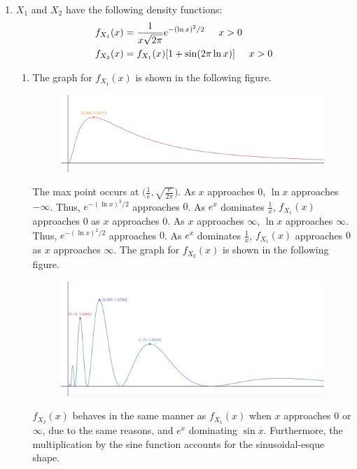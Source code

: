 \documentclass[a4paper]{article}
\newcommand{\ds}{\displaystyle}
\begin{document}
\begin{enumerate}

	\item $\ds{X_{1}}$ and $\ds{X_{2}}$ have the following density functions:
	\begin{align*}
		f_{X_1}(x) & = \frac{1}{x\sqrt{2\pi}}e^{-(\ln{x})^2/2} \hspace{5mm} x > 0 \\
		f_{X_2}(x) & = f_{X_1}(x)[1 + \sin(2\pi \ln{x})] \hspace{5mm} x > 0 \\
	\end{align*}
	\begin{enumerate}

		\item The graph for $\ds{f_{X_1}(x)}$ is shown in the following figure.
		\begin{figure}[h!]
			\begin{center}
				\includegraphics[width=0.6\linewidth]{12.png}
			\end{center}
		\end{figure}
		\bigbreak
		The max point occurs at $\ds{\bigg(\frac{1}{e},\sqrt{\frac{e}{2\pi}}\bigg)}$. As $\ds{x}$ approaches $\ds{0}$, $\ds{\ln x}$ approaches $\ds{-\infty}$. Thus, $\ds{e^{-(\ln{x})^2/2}}$ approaches $\ds{0}$. As $\ds{e^x}$ dominates $\ds{\frac{1}{x}}$, $\ds{f_{X_1}(x)}$ approaches $\ds{0}$ as $\ds{x}$ approaches $\ds{0}$. As $\ds{x}$ approaches $\ds{\infty}$, $\ds{\ln x}$ approaches $\ds{\infty}$. Thus, $\ds{e^{-(\ln{x})^2/2}}$ approaches $\ds{0}$. As $\ds{e^x}$ dominates $\ds{\frac{1}{x}}$, $\ds{f_{X_1}(x)}$ approaches $\ds{0}$ as $\ds{x}$ approaches $\ds{\infty}$.
		\bigbreak
		The graph for $\ds{f_{X_2}(x)}$ is shown in the following figure.
		\begin{figure}[h!]
			\begin{center}
				\includegraphics[width=0.6\linewidth]{22.png}
			\end{center}
		\end{figure}
		\bigbreak
		$\ds{f_{X_2}(x)}$ behaves in the same manner as $\ds{f_{X_1}(x)}$ when $\ds{x}$ approaches $\ds{0}$ or $\ds{\infty}$, due to the same reasons, and $\ds{e^x}$ dominating $\ds{\sin x}$. Furthermore, the multiplication by the sine function accounts for the sinusoidal-esque shape.


\end{enumerate}
\end{enumerate}
\end{document}

